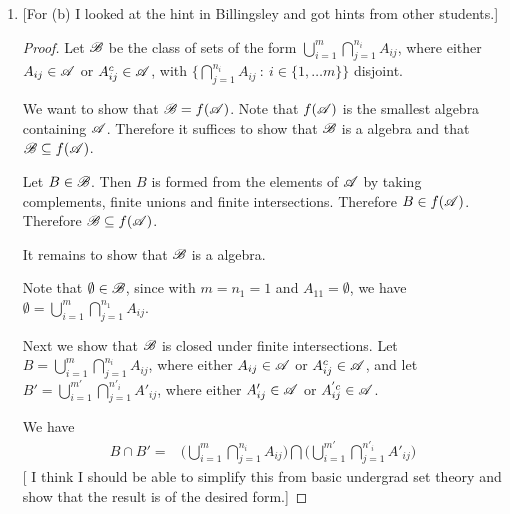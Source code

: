 \begin{enumerate}
\begin{enumerate}[label=(\alph*)]
    \begin{claim*}
      $f(\ms A)$ is minimal in the sense that if $\ms G$ is an algebra and $\ms A \subset \ms G$, then $f(\ms A) \subset \ms G$.
    \end{claim*}
    \begin{proof}
      If $\ms G$ is an algebra with $\ms A \subset \ms G$ then $\ms G \in \{\ms F_1, \ms F_2, \ldots\}$, therefore $\ms G \supset \bigcap_{n}\ms F_n = f(\ms A)$.
    \end{proof}

  \item

    [For (b) I looked at the hint in Billingsley and got hints from other students.]

    \begin{proof}
      Let $\mathscr B$ be the class of sets of the form $\bigcup_{i=1}^m \bigcap_{j=1}^{n_i} A_{ij}$, where
      either $A_{ij} \in \mathscr A$ or $A^c_{ij} \in \mathscr A$,
      with $\big\{\bigcap_{j=1}^{n_i} A_{ij} ~ : ~ i \in \{1, \ldots m\}\big\}$ disjoint.

      We want to show that $\mathscr B = f(\mathscr A)$. Note that $f(\ms A)$ is the smallest algebra containing $\mathscr A$.
      Therefore it suffices to show that $\mathscr B$ is a algebra and that $\mathscr B \subseteq f(\mathscr A)$.

      Let $B \in \mathscr B$. Then $B$ is formed from the elements of $\mathscr A$ by taking complements, finite unions
      and finite intersections. Therefore $B \in f(\mathscr A)$. Therefore $\mathscr B \subseteq f(\mathscr A)$.

      It remains to show that $\mathscr B$ is a algebra.

      Note that $\emptyset \in \mathscr B$, since with $m = n_1 = 1$ and $A_{11} = \emptyset$, we
      have $\emptyset = \bigcup_{i=1}^m\bigcap_{j=1}^{n_1}A_{ij}$.

      Next we show that $\mathscr B$ is closed under finite intersections.
      Let $B = \bigcup_{i=1}^m \bigcap_{j=1}^{n_i} A_{ij}$, where either $A_{ij} \in \mathscr A$
      or $A^c_{ij} \in \mathscr A$, and let $B' = \bigcup_{i=1}^{m'} \bigcap_{j=1}^{n'_i} A'_{ij}$, where
      either $A'_{ij} \in \mathscr A$ or $A^{'c}_{ij} \in \mathscr A$.

      We have
      \begin{align*}
        B \cap B'
        =& \big(\bigcup_{i=1}^m \bigcap_{j=1}^{n_i} A_{ij}\big)
           \bigcap
           \big(\bigcup_{i=1}^{m'} \bigcap_{j=1}^{n'_{i}} A'_{ij}\big)
      \end{align*}
      [ I think I should be able to simplify this from basic undergrad set theory and show that the result
      is of the desired form.]


\end{proof}
\end{enumerate}
\end{enumerate}
